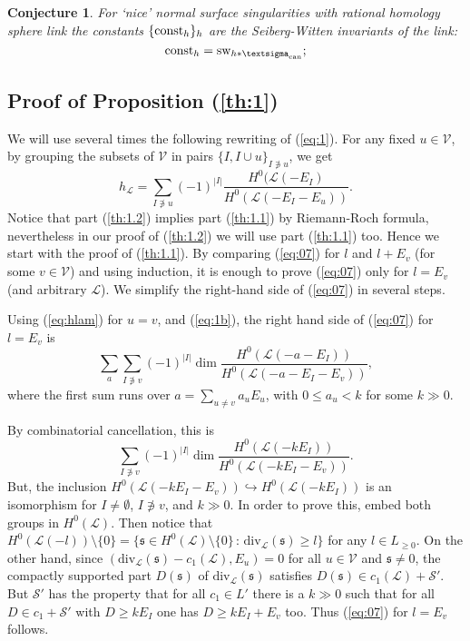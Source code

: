 \documentclass[10pt,a4paper]{amsart}
\numberwithin{equation}{section}
\numberwithin{equation}{subsection}
\theoremstyle{plain}
\newtheorem{conjecture}[equation]{Conjecture}
\theoremstyle{definition}
\begin{document}
\begin{conjecture}\label{SWIC}
For `nice' normal surface singularities with rational homology
sphere link the constants $\{{\rm const}_h\}_h$ are the Seiberg-Witten
invariants of the link:
\begin{equation*}
\mathrm{const}_h={\operatorname{sw}\sb{{h*{\textsigma}_{\mathrm{can}}}}};
\end{equation*}
\end{conjecture}

\subsection{Proof of Proposition  (\ref{th:1})}\label{ss:prth1}
We will use several times the following rewriting of (\ref{eq:1}).
For any fixed $u\in {\mathcal{V}}$, by grouping the subsets of ${\mathcal{V}}$ in
pairs $\{I,I\cup u\}_{I\not\ni u}$, we get
\begin{equation}\label{eq:hlam}
h_{\mathcal{L}}=\sum_{I\not\ni
u}(-1)^{|I|}\frac{H^0({\mathcal{L}}(-E_I)}{H^0({\mathcal{L}}
(-E_I-E_u))}.
\end{equation}
Notice that part (\ref{th:1.2}) implies part (\ref{th:1.1}) by
Riemann-Roch formula, nevertheless in our proof of (\ref{th:1.2})
we will use part (\ref{th:1.1}) too. Hence we start with the proof
of (\ref{th:1.1}). By comparing (\ref{eq:07}) for $l$ and $l+E_v$
(for some $v\in{\mathcal{V}}$) and using induction, it is enough to prove
(\ref{eq:07}) only for $l=E_v$ (and arbitrary ${\mathcal{L}}$). We
simplify the right-hand side of (\ref{eq:07}) in several steps.

Using (\ref{eq:hlam}) for $u=v$, and (\ref{eq:1b}), the right hand
side of (\ref{eq:07}) for $l=E_v$ is
\begin{equation*}
\sum_a\sum_{I\not\ni
v}(-1)^{|I|}\dim\frac{H^0({\mathcal{L}}(-a-E_I))}{H^0({\mathcal{L}}(-a-E_I-E_v))},
\end{equation*}
where the first sum runs over $a=\sum_{u\not =v}a_uE_u$, with
$0\leq a_u < k$ for some $k\gg 0$.

By combinatorial cancellation, this is
\begin{equation*}
\sum_{I\not\ni
v}(-1)^{|I|}\dim\frac{H^0({\mathcal{L}}(-kE_I))}{H^0({\mathcal{L}}(-kE_I-E_v))}.
\end{equation*}
But,  the inclusion $H^0({\mathcal{L}}(-kE_I-E_v))\hookrightarrow
H^0({\mathcal{L}}(-kE_I))$ is an isomorphism  for $I\not=\emptyset$,
$I\not\ni v$,  and $k\gg 0$. In order to prove this, embed both
groups in $H^0({\mathcal{L}})$. Then notice that
$H^0({\mathcal{L}}(-l))\setminus \{0\}=\{{\mathfrak{s}}\in
H^0({\mathcal{L}})\setminus \{0\}\,:\, \mathrm{div}_{\mathcal{L}}
({\mathfrak{s}})\geq l\}$ for any $l\in L_{\geq 0}$. On the other hand,
since $(\mathrm{div}_{\mathcal{L}}({\mathfrak{s}})-c_1({\mathcal{L}}),E_u)=0$ for
all $u\in{\mathcal{V}}$ and ${\mathfrak{s}}\not=0$, the compactly supported part
$D({\mathfrak{s}})$ of $\mathrm{div}_{\mathcal{L}}({\mathfrak{s}})$ satisfies $D({\mathfrak{s}})\in
c_1({\mathcal{L}})+{\mathcal{S}}'$. But ${\mathcal{S}}'$ has the property  that for
all $c_1\in L'$ there is a $k\gg 0$ such that for all 
$D\in c_1+{\mathcal{S}}'$ with  $D\geq kE_I$ one has  $D\geq kE_I+E_v$ too.  
Thus (\ref{eq:07}) for $l=E_v$ follows.
\end{document}
